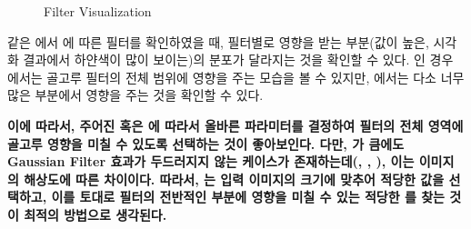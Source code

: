 \documentclass{report}
\begin{document}
\begin{figure}[htbp]
    \medskip


    \caption{Filter Visualization}
\end{figure}


같은 에서 에 따른 필터를 확인하였을 때, 필터별로 영향을 받는 부분(값이 높은, 시각화 결과에서 하얀색이 많이 보이는)의 분포가 달라지는 것을 확인할 수 있다.
인 경우 에서는 골고루 필터의 전체 범위에 영향을 주는 모습을 볼 수 있지만, 에서는 다소 너무 많은 부분에서 영향을 주는 것을 확인할 수 있다.

\textbf{
    이에 따라서, 주어진  혹은 에 따라서 올바른 파라미터를 결정하여 필터의 전체 영역에 골고루 영향을 미칠 수 있도록 선택하는 것이 좋아보인다.
    다만, 가 큼에도 Gaussian Filter 효과가 두드러지지 않는 케이스가 존재하는데(, , ), 이는 이미지의 해상도에 따른 차이이다.
    따라서, 는 입력 이미지의 크기에 맞추어 적당한 값을 선택하고, 이를 토대로 필터의 전반적인 부분에 영향을 미칠 수 있는 적당한 를 찾는 것이 최적의 방법으로 생각된다.
}
\end{document}
